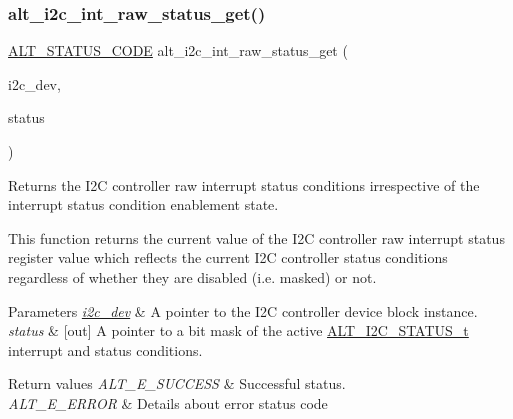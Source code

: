 \subsubsection{\texorpdfstring{alt\_i2c\_int\_raw\_status\_get()}{alt\_i2c\_int\_raw\_status\_get()}}
{\footnotesize\ttfamily \mbox{\hyperlink{hwlib_8h_abdb0d369f069723ca55d6c94bcaaaa12}{A\+L\+T\+\_\+\+S\+T\+A\+T\+U\+S\+\_\+\+C\+O\+DE}} alt\+\_\+i2c\+\_\+int\+\_\+raw\+\_\+status\+\_\+get (\begin{DoxyParamCaption}\item[{\mbox{\hyperlink{structALT__I2C__DEV__s}{A\+L\+T\+\_\+\+I2\+C\+\_\+\+D\+E\+V\+\_\+t}} $\ast$}]{i2c\+\_\+dev,  }\item[{uint32\+\_\+t $\ast$}]{status }\end{DoxyParamCaption})}

Returns the I2C controller raw interrupt status conditions irrespective of the interrupt status condition enablement state.

This function returns the current value of the I2C controller raw interrupt status register value which reflects the current I2C controller status conditions regardless of whether they are disabled (i.\+e. masked) or not.


\begin{DoxyParams}{Parameters}
{\em \mbox{\hyperlink{structi2c__dev}{i2c\+\_\+dev}}} & A pointer to the I2C controller device block instance.\\
\hline
{\em status} & \mbox{[}out\mbox{]} A pointer to a bit mask of the active \mbox{\hyperlink{group__ALT__I2C_gaff6fbc8f47536dd27035588f0ea138fe}{A\+L\+T\+\_\+\+I2\+C\+\_\+\+S\+T\+A\+T\+U\+S\+\_\+t}} interrupt and status conditions.\\
\hline
\end{DoxyParams}

\begin{DoxyRetVals}{Return values}
{\em A\+L\+T\+\_\+\+E\+\_\+\+S\+U\+C\+C\+E\+SS} & Successful status. \\
\hline
{\em A\+L\+T\+\_\+\+E\+\_\+\+E\+R\+R\+OR} & Details about error status code \\
\hline
\end{DoxyRetVals}
\mbox{\label{group__ALT__I2C__INT_ga55a40d841dd93d2861a4597603844776}} 
